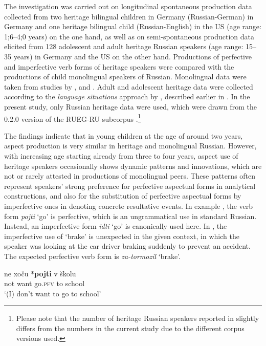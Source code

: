 \documentclass[output=paper,colorlinks,citecolor=brown]{langscibook}
\begin{document}
The investigation was carried out on longitudinal spontaneous production data collected from two heritage bilingual children in Germany (Russian\hyp German) in Germany and one heritage bilingual child (Russian\hyp English) in the US (age range: 1;6--4;0 years) on the one hand, as well as on semi-spontaneous production data elicited from 128 adolescent and adult heritage Russian speakers (age range: 15--35 years) in Germany and the US on the other hand.
Productions of perfective and imperfective verb forms of heritage speakers were compared with the productions of child monolingual speakers of Russian. 
Monolingual data were taken from studies by \textcite{bar2002tense, kistanova2019acquisition, bondarko2011kategorizacija}, and \textcite{Gagarina2007}.
Adult and adolescent heritage data were collected according to the \textit{language situations} approach by \textcite{wiese2020language}, described earlier in . 
In the present study, only Russian heritage data were used, which were drawn from the 0.2.0 version of the RUEG-RU subcorpus \parencite{RUEGcorpus2019_v.0.2.0}.\footnote{Please note that the number of heritage Russian speakers reported in \textcite{RizouEtAl} slightly differs from the numbers in the current study due to the different corpus versions used.}

The findings indicate that in young children at the age of around two years, aspect production is very similar in heritage and monolingual Russian. 
However, with increasing age starting already from three to four years, aspect use of heritage speakers occasionally shows dynamic patterns and innovations, which are not or rarely attested in productions of monolingual peers. 
These patterns often represent speakers' strong preference for perfective aspectual forms in analytical constructions, and also for the substitution of perfective aspectual forms by imperfective ones in denoting concrete resultative events.
In example , the verb form \textit{pojti} ‘go' is perfective, which is an ungrammatical use in standard Russian. Instead, an imperfective form \textit{idti} ‘go' is canonically used here.
In , the imperfective use of ‘brake' is unexpected in the given context, in which the speaker was looking at the car driver braking suddenly to prevent an accident. The expected perfective verb form is \textit{za-tormozil} ‘brake'. 

\ea \label{RUinnovations1}
 \gll ne xoču *\textbf{pojti} v školu\\
 not want \hphantom{*}go.\textsc{pfv} to school\\
 \glt `(I) don't want to go to school'
 \z
 
\end{document}
